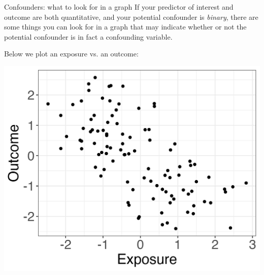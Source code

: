\documentclass[10pt,t]{beamer}
\begin{document}
\begin{frame}{Confounders: what to look for in a graph}
If your predictor of interest and outcome are both quantitative, and your potential confounder is \textit{binary}, there are some things you can look for in a graph that may indicate whether or not the potential confounder is in fact a confounding variable. \pause

\vspace{0.3cm}

Below we plot an exposure vs. an outcome:

\vspace{0.3cm}

\centering \includegraphics[scale=0.4]{p0.png}
\end{frame}
\end{document}
